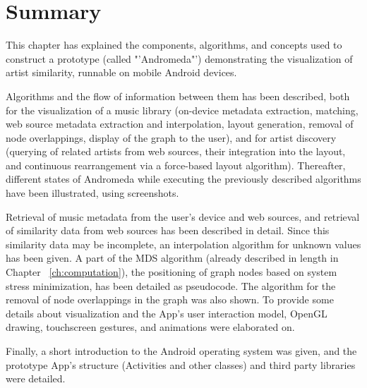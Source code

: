 \section{Summary}

This chapter has explained the components, algorithms, and concepts used to construct a prototype (called "'Andromeda"') demonstrating the visualization of artist similarity, runnable on mobile Android devices.

Algorithms and the flow of information between them has been described, both for the visualization of a music library (on-device metadata extraction, matching, web source metadata extraction and interpolation, layout generation, removal of node overlappings, display of the graph to the user), and for artist discovery (querying of related artists from web sources, their integration into the layout, and continuous rearrangement via a force-based layout algorithm).
Thereafter, different states of Andromeda while executing the previously described algorithms have been illustrated, using screenshots.

Retrieval of music metadata from the user's device and web sources, and retrieval of similarity data from web sources has been described in detail. Since this similarity data may be incomplete, an interpolation algorithm for unknown values has been given.
A part of the MDS algorithm (already described in length in Chapter ~\ref{ch:computation}), the  positioning of graph nodes based on system stress minimization, has been detailed as pseudocode. The algorithm for the removal of node overlappings in the graph was also shown.
To provide some details about visualization and the App's user interaction model, OpenGL drawing, touchscreen gestures, and animations were elaborated on.

Finally, a short introduction to the Android operating system was given, and the prototype App's structure (Activities and other classes) and third party libraries were detailed.